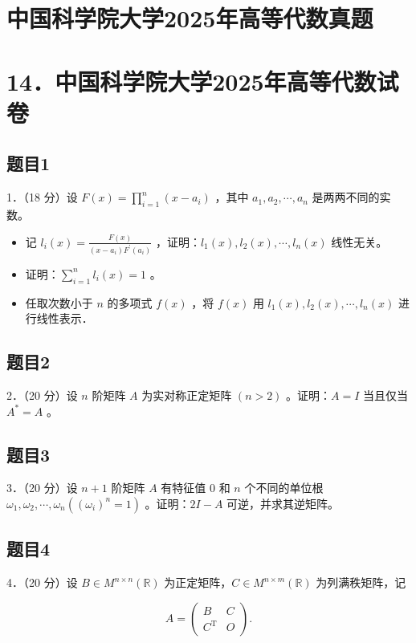 \documentclass{article}
\begin{document}
\section*{中国科学院大学2025年高等代数真题}
\section*{14．中国科学院大学2025年高等代数试卷}

\subsection{题目1}
1．（18 分）设 \(F(x)=\prod_{i=1}^{n}\left(x-a_{i}\right)\) ，其中 \(a_{1}, a_{2}, \cdots, a_{n}\) 是两两不同的实数。

\begin{itemize}
  \item[（1）] 记 \(l_{i}(x)=\frac{F(x)}{\left(x-a_{i}\right) F^{\prime}\left(a_{i}\right)}\) ，证明：\(l_{1}(x), l_{2}(x), \cdots, l_{n}(x)\) 线性无关。
  \item[（2）] 证明：\(\sum_{i=1}^{n} l_{i}(x)=1\) 。
  \item[（3）] 任取次数小于 \(n\) 的多项式 \(f(x)\) ，将 \(f(x)\) 用 \(l_{1}(x), l_{2}(x), \cdots, l_{n}(x)\) 进行线性表示．
\end{itemize}

\subsection{题目2}
2．（20 分）设 \(n\) 阶矩阵 \(A\) 为实对称正定矩阵 \((n>2)\) 。证明：\(A=I\) 当且仅当 \(A^{*}=A\) 。

\subsection{题目3}
3．（20 分）设 \(n+1\) 阶矩阵 \(A\) 有特征值 0 和 \(n\) 个不同的单位根 \(\omega_{1}, \omega_{2}, \cdots, \omega_{n}\left(\left(\omega_{i}\right)^{n}=1\right)\) 。证明：\(2 I-A\) 可逆，并求其逆矩阵。

\subsection{题目4}
4．（20 分）设 \(B \in M^{n \times n}(\mathbb{R})\) 为正定矩阵，\(C \in M^{n \times m}(\mathbb{R})\) 为列满秩矩阵，记

\[
A=\left(\begin{array}{cc}
B & C \\
C^{\mathrm{T}} & O
\end{array}\right) .
\]
\end{document}

